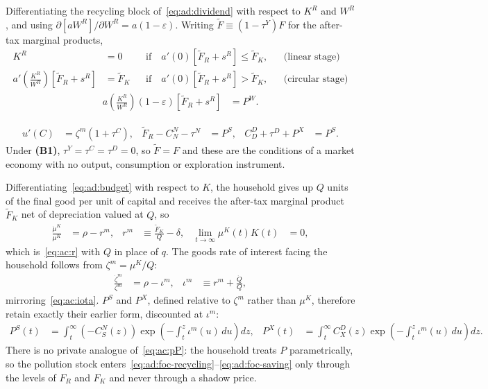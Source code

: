  Differentiating the recycling block of~\eqref{eq:ad:dividend} with respect to $K^R$ and $W^R$, and using $\partial\left[aW^R\right]/\partial W^R=a(1-\varepsilon)$. Writing $\widetilde F\equiv\left(1-\tau^Y\right)F$ for the after-tax marginal products,
\begin{subequations}\label{eq:ad:foc-recycling}
\begin{align}
K^R&=0
&&\text{if}\quad a'(0)\left[\widetilde F_R+s^R\right]\le \widetilde F_K,
&&\text{(linear stage)}
\label{eq:ad:foc-recycling-a}
\\
a'\!\left(\frac{K^R}{W^R}\right)\left[\widetilde F_R+s^R\right]&=\widetilde F_K
&&\text{if}\quad a'(0)\left[\widetilde F_R+s^R\right]> \widetilde F_K,
&&\text{(circular stage)}
\label{eq:ad:foc-recycling-b}
\end{align}
\end{subequations}
\begin{align}
a\!\left(\frac{K^R}{W^R}\right)(1-\varepsilon)\left[\widetilde F_R+s^R\right] &= P^W.
\label{eq:ad:foc-waste-use}
\end{align}

\begin{align}
u'(C) &= \zeta^m\left(1+\tau^C\right),
&
\widetilde F_R-C^N_N-\tau^N &= P^S,
&
C^D_D+\tau^D+P^X &= P^S.
\label{eq:ad:foc-saving}
\end{align}
Under \textbf{(B1)}, $\tau^Y=\tau^C=\tau^D=0$, so $\widetilde F=F$ and these are the conditions of a market economy with no output, consumption or exploration instrument.

 Differentiating~\eqref{eq:ad:budget} with respect to $K$, the household gives up $Q$ units of the final good per unit of capital and receives the after-tax marginal product $\widetilde F_K$ net of depreciation valued at $Q$, so
\begin{align}
\frac{\dot\mu^K}{\mu^K} &= \rho-r^m,
&
r^m &\equiv \frac{\widetilde F_K}{Q}-\delta,
&
\lim_{t\to\infty}\mu^K(t)K(t)&=0,
\label{eq:ad:muK}
\end{align}
which is~\eqref{eq:ac:r} with $Q$ in place of $q$. The goods rate of interest facing the household follows from $\zeta^m=\mu^K/Q$:
\begin{align}
\frac{\dot\zeta^m}{\zeta^m} &= \rho-\iota^m,
&
\iota^m &\equiv r^m+\frac{\dot Q}{Q},
\label{eq:ad:iotam}
\end{align}
mirroring~\eqref{eq:ac:iota}. $P^S$ and $P^X$, defined relative to $\zeta^m$ rather than $\mu^K$, therefore retain exactly their earlier form, discounted at $\iota^m$:
\begin{align}
P^S(t) &= \int_t^{\infty}\left(-C^N_S(z)\right)\exp\left(-\int_t^{z}\iota^m(u)\,du\right)dz,
&
P^X(t) &= \int_t^{\infty}C^D_X(z)\exp\left(-\int_t^{z}\iota^m(u)\,du\right)dz.
\label{eq:ad:PS-PX}
\end{align}
There is no private analogue of~\eqref{eq:ac:pP}: the household treats $P$ parametrically, so the pollution stock enters~\eqref{eq:ad:foc-recycling}--\eqref{eq:ad:foc-saving} only through the levels of $F_R$ and $F_K$ and never through a shadow price.

